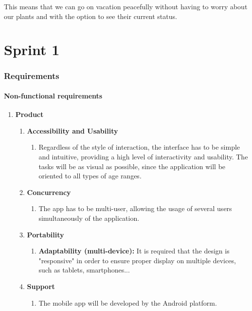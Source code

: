 \documentclass[11pt,a4paper]{article}
\begin{document}
This means that we can go on vacation peacefully without having to worry about our plants and with the option to see their current status.

\part{Sprint 1}
\section{Requirements}
\subsection{Non-functional requirements}
\begin{enumerate}
\item \textbf{Product}
	\begin{enumerate}
	
	\item \textbf{Accessibility and Usability}
		\begin{enumerate}
		\item Regardless of the style of interaction, the interface has to be simple and intuitive, providing a high level of interactivity and usability. The tasks will be as visual as possible, since the application will be oriented to all types of age ranges. 
		\end{enumerate}
	\item \textbf{Concurrency}
		\begin{enumerate}
		\item  The app has to be multi-user, allowing the usage of several users simultaneously of the application.
		\end{enumerate}
		
	\item \textbf{Portability}
		\begin{enumerate}
		\item \textbf{Adaptability (multi-device):} It is required that the design is "responsive" in order to ensure proper display on multiple devices, such as tablets, smartphones...
		\end{enumerate}
		
	\item \textbf{Support}
		\begin{enumerate}
		\item The mobile app will be developed by the Android platform.
		\end{enumerate}
	\end{enumerate}


\end{enumerate}
\end{document}

